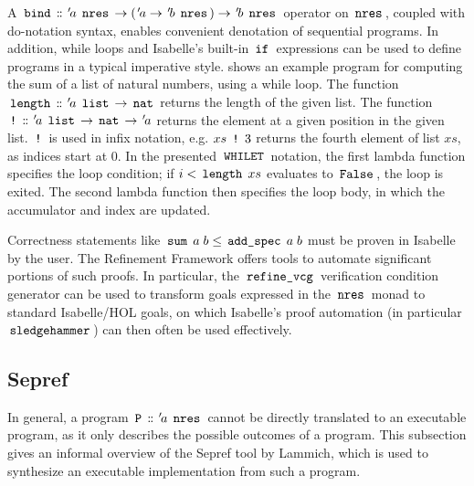 A $\,\text{\ttfamily bind}\, \mathrel{\mathord{:}\mkern-1.2mu\mathord{:}} {\mskip2mu '\mskip-2mua} \; \,\text{\ttfamily nres}\, \rightarrow ({\mskip2mu '\mskip-2mua} \rightarrow {\mskip2mu '\mskip-2mub} \; \,\text{\ttfamily nres}\,) \rightarrow {\mskip2mu '\mskip-2mub} \; \,\text{\ttfamily nres}\,$ operator on $\,\text{\ttfamily nres}\,$, coupled with do-notation syntax, enables convenient denotation of sequential programs.
In addition, while loops and Isabelle's built-in $\,\text{\ttfamily if}\,$ expressions can be used to define programs in a typical imperative style.
 shows an example program for computing the sum of a list of natural numbers, using a while loop.
The function $\,\text{\ttfamily length}\, \mathrel{\mathord{:}\mkern-1.2mu\mathord{:}} {\mskip2mu '\mskip-2mua} \; \,\text{\ttfamily list}\, \rightarrow \,\text{\ttfamily nat}\,$ returns the length of the given list.
The function $\,\text{\ttfamily !}\, \mathrel{\mathord{:}\mkern-1.2mu\mathord{:}} {\mskip2mu '\mskip-2mua} \; \,\text{\ttfamily list}\, \rightarrow \,\text{\ttfamily nat}\, \rightarrow {\mskip2mu '\mskip-2mua}$ returns the element at a given position in the given list.
$\,\text{\ttfamily !}\,$ is used in infix notation, e.g. $xs \; \,\text{\ttfamily !}\, \; 3$ returns the fourth element of list $xs$, as indices start at $0$.
In the presented $\,\text{\ttfamily WHILET}\,$ notation, the first lambda function specifies the loop condition; if $i < \,\text{\ttfamily length}\, \; xs$ evaluates to $\,\text{\ttfamily False}\,$, the loop is exited.
The second lambda function then specifies the loop body, in which the accumulator and index are updated.

Correctness statements like $\,\text{\ttfamily sum}\, \; a \; b \le \,\text{\ttfamily add\_spec}\, \; a \; b$ must be proven in Isabelle by the user.
The Refinement Framework offers tools to automate significant portions of such proofs.
In particular, the $\,\text{\ttfamily refine\_vcg}\,$ verification condition generator can be used to transform goals expressed in the $\,\text{\ttfamily nres}\,$ monad to standard Isabelle/HOL goals, on which Isabelle's proof automation (in particular $\,\text{\ttfamily sledgehammer}\,$) can then often be used effectively.

\subsection{Sepref}\label{sec:sepref}

In general, a program $\,\text{\ttfamily P}\, \mathrel{\mathord{:}\mkern-1.2mu\mathord{:}} {\mskip2mu '\mskip-2mua} \; \,\text{\ttfamily nres}\,$ cannot be directly translated to an executable program, as it only describes the possible outcomes of a program.
This subsection gives an informal overview of the Sepref tool \cite{sepref} by Lammich, which is used to synthesize an executable implementation from such a program.

